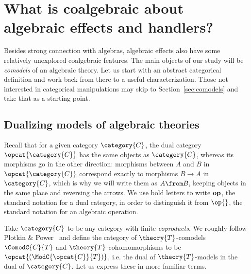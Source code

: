\section{What is coalgebraic about algebraic effects and handlers?}

Besides strong connection with algebras, algebraic effects also have some relatively unexplored coalgebraic features. The main objects of our study will be \emph{comodels} of an algebraic theory. Let us start with an abstract categorical definition and work back from there to a useful characterization. Those not interested in categorical manipulations may skip to Section~\ref{sec:comodels} and take that as a starting point.

\subsection{Dualizing models of algebraic theories}
\label{sec:dualizing-models}

Recall that for a given category $\category{C}$, the dual category $\opcat{\category{C}}$ has the same objects as $\category{C}$, whereas its morphisms go in the other direction: morphisms between $A$ and $B$ in $\opcat{\category{C}}$ correspond exactly to morphisms $B \to A$ in $\category{C}$, which is why we will write them as $A \from B$, keeping objects in the same place and reversing the arrows. We use bold letters to write $\text{\textbf{op}}$, the standard notation for a dual category, in order to distinguish it from $\op{}$, the standard notation for an algebraic operation.

Take $\category{C}$ to be any category with finite \emph{coproducts}. We roughly follow Plotkin \& Power~\cite{power} and define the category of $\theory{T}$-comodels $\ComodC{C}{T}$ and $\theory{T}$-cohomomorphisms to be $\opcat{(\ModC{\opcat{C}}{T})}$, i.e. the dual of $\theory{T}$-models in the dual of $\category{C}$. Let us express these in more familiar terms.

